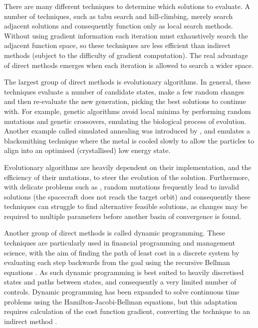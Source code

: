 There are many different techniques to determine which solutions to evaluate. A number of techniques, such as tabu search and hill-climbing, merely search adjacent solutions and consequently function only as local search methods. Without using gradient information each iteration must exhaustively search the adjacent function space, so these techniques are less efficient than indirect methods (subject to the difficulty of gradient computation). The real advantage of direct methods emerges when each iteration is allowed to search a wider space.

The largest group of direct methods is evolutionary algorithms. In general, these techniques evaluate a number of candidate states, make a few random changes and then re-evaluate the new generation, picking the best solutions to continue with. For example, genetic algorithms avoid local minima by performing random mutations and genetic crossovers, emulating the biological process of evolution. Another example called simulated annealing was introduced by \textcite{Kirkpatrick1983}, and emulates a blacksmithing technique where the metal is cooled slowly to allow the particles to align into an optimised (crystallised) low energy state. 

Evolutionary algorithms are heavily dependent on their implementation, and the efficiency of their mutations, to steer the evolution of the solution. Furthermore, with delicate problems such as \BW, random mutations frequently lead to invalid solutions (the spacecraft does not reach the target orbit) and consequently these techniques can struggle to find alternative feasible solutions, as changes may be required to multiple parameters before another basin of convergence is found.

Another group of direct methods is called dynamic programming. These techniques are particularly used in financial programming and management science, with the aim of finding the path of least cost in a discrete system by evaluating each step backwards from the goal using the recursive Bellman equations \parencite{recipes}. As such dynamic programming is best suited to heavily discretised states and paths between states, and consequently a very limited number of controls. Dynamic programming has been expanded to solve continuous time problems using the Hamilton-Jacobi-Bellman equations, but this adaptation requires calculation of the cost function gradient, converting the technique to an indirect method \parencite{recipes}.


